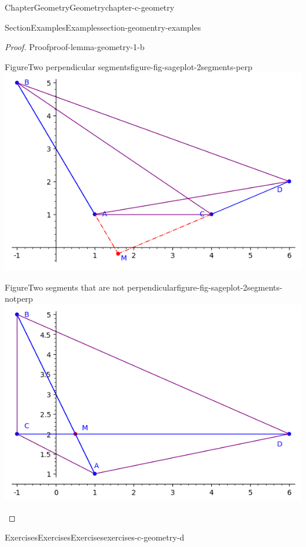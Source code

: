 \documentclass[oneside,10pt,]{book}
\numberwithin{equation}{section}
\begin{document}
\begin{chapterptx}{Chapter}{Geometry}{}{Geometry}{}{}{chapter-c-geometry}
\begin{sectionptx}{Section}{Examples}{}{Examples}{}{}{section-geomentry-examples}
\begin{proof}{Proof}{}{proof-lemma-geometry-1-b}
\begin{sidebyside}{2}{0}{0}{0}
\begin{sbspanel}{0.5}
\begin{figureptx}{Figure}{Two perpendicular segments}{figure-fig-sageplot-2segments-perp}{}
\includegraphics[width=\linewidth]{images/sageplot-2segments-perp.png}
\tcblower
\end{figureptx}%
\end{sbspanel}%
\begin{sbspanel}{0.5}%
\begin{figureptx}{Figure}{Two segments that are not perpendicular}{figure-fig-sageplot-2segments-notperp}{}%
\includegraphics[width=\linewidth]{images/sageplot-2segments-notperp.png}
\tcblower
\end{figureptx}%
\end{sbspanel}%
\end{sidebyside}%
\end{proof}
\end{sectionptx}
%
%
\typeout{************************************************}
\typeout{************************************************}
%
\begin{exercises-section}{Exercises}{Exercises}{}{Exercises}{}{}{exercises-c-geometry-d}

\end{exercises-section}
\end{chapterptx}
\end{document}
